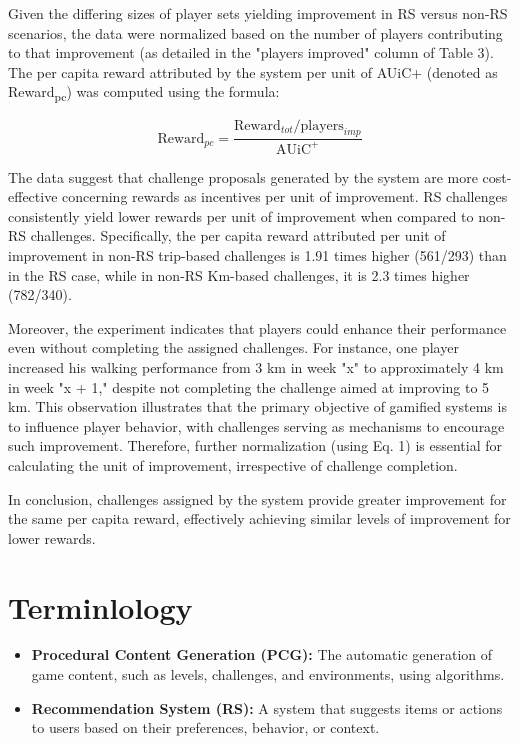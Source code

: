 Given the differing sizes of player sets yielding improvement in RS versus non-RS scenarios, the data were normalized based on the number of players contributing to that improvement (as detailed in the "players improved" column of Table 3). The per capita reward attributed by the system per unit of AUiC+ (denoted as Reward\textsubscript{pc}) was computed using the formula:

\begin{equation}
\text{Reward}_{pc} = \frac{\text{Reward}_{tot}/\text{players}_{imp}}{\text{AUiC}^+}
\end{equation}

The data suggest that challenge proposals generated by the system are more cost-effective concerning rewards as incentives per unit of improvement. RS challenges consistently yield lower rewards per unit of improvement when compared to non-RS challenges. Specifically, the per capita reward attributed per unit of improvement in non-RS trip-based challenges is 1.91 times higher (561/293) than in the RS case, while in non-RS Km-based challenges, it is 2.3 times higher (782/340).

Moreover, the experiment indicates that players could enhance their performance even without completing the assigned challenges. For instance, one player increased his walking performance from 3 km in week "x" to approximately 4 km in week "x + 1," despite not completing the challenge aimed at improving to 5 km. This observation illustrates that the primary objective of gamified systems is to influence player behavior, with challenges serving as mechanisms to encourage such improvement. Therefore, further normalization (using Eq. 1) is essential for calculating the unit of improvement, irrespective of challenge completion.

In conclusion, challenges assigned by the system provide greater improvement for the same per capita reward, effectively achieving similar levels of improvement for lower rewards.


\section{Terminlology}
\begin{itemize}
    \item \textbf{Procedural Content Generation (PCG):} The automatic generation of game content, such as levels, challenges, and environments, using algorithms.
    \item \textbf{Recommendation System (RS):} A system that suggests items or actions to users based on their preferences, behavior, or context.
\end{itemize}